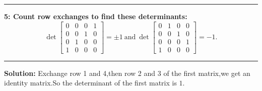 \documentclass[11pt]{article}
\newcommand\question[2]{\vspace{.25in}\hrule\textbf{#1: #2}\vspace{.5em}\hrule\vspace{.10in}}
\newcommand\solution{\vspace{.10in}\textbf{Solution: }}
\begin{document}
\question{5}{Count row exchanges to find these determinants:
$$
\det
\begin{bmatrix}
  0&0&0&1\\
  0&0&1&0\\
  0&1&0&0\\
  1&0&0&0
\end{bmatrix}=\pm 1~\mbox{and}~\det
\begin{bmatrix}
  0&1&0&0\\
0&0&1&0\\
0&0&0&1\\
1&0&0&0
\end{bmatrix}=-1.
$$
}
\solution Exchange row 1 and 4,then row 2 and 3 of the first matrix,we get an identity matrix.So
the determinant of the first matrix is $1$.\\
\end{document}
